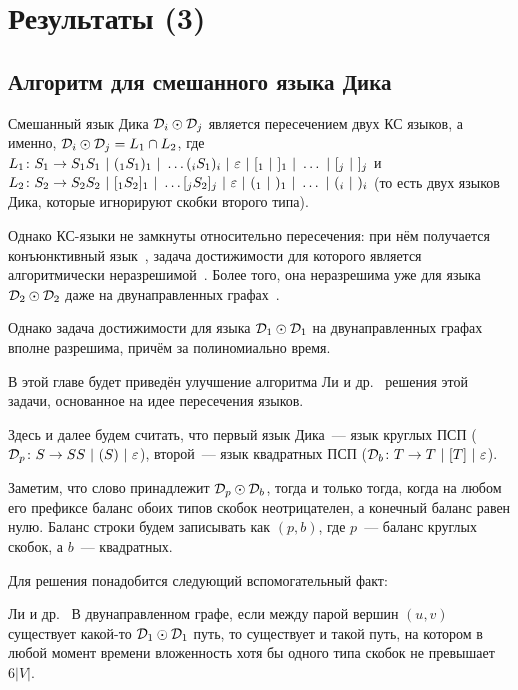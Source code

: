 \section{Результаты (3)}\label{section:dyck_1_1}

\subsection{Алгоритм для смешанного языка Дика}

Смешанный язык Дика $\mathcal{D}_i \odot \mathcal{D}_j$ является пересечением двух КС языков, а именно, 
$\mathcal{D}_i \odot \mathcal{D}_j = L_1 \cap L_2$, где 
$L_1 \colon S_1 \rightarrow S_1 S_1~|~(_1 S_1 )_1~|~ \dots (_i S_1 )_i ~|~ \varepsilon ~|~ [_1 ~|~ ]_1 ~|~ \dots ~|~ [_j ~|~ ]_j$ и 
$L_2 \colon S_2 \rightarrow S_2 S_2~|~[_1 S_2 ]_1~|~ \dots [_j S_2 ]_j ~|~ \varepsilon ~|~ (_1 ~|~ )_1 ~|~ \dots ~|~ (_i ~|~ )_i$ 
(то есть двух языков Дика, которые игнорируют скобки второго типа). 

Однако КС-языки не замкнуты относительно пересечения: при нём получается конъюнктивный язык~\cite{Okhotin01}, задача достижимости для которого является алгоритмически неразрешимой~\cite{Hellings14}. Более того, она неразрешима уже для языка $\mathcal{D}_2 \odot \mathcal{D}_2$ даже на двунаправленных графах~\cite{Li21}. 

Однако задача достижимости для языка $\mathcal{D}_1 \odot \mathcal{D}_1$ на двунаправленных графах вполне разрешима, причём за полиномиально время.

В этой главе будет приведён улучшение алгоритма Ли и др.~\cite{Li21} решения этой задачи, основанное на идее пересечения языков.

\begin{note}\label{fact:intersection}

  Здесь и далее будем считать, что первый язык Дика~--- язык круглых ПСП ($\mathcal{D}_p \colon S \rightarrow SS~|~(S)~|~\varepsilon$), второй~--- язык квадратных ПСП ($\mathcal{D}_b \colon T \rightarrow T~|~[T]~|~\varepsilon$).
\end{note}

Заметим, что слово принадлежит $\mathcal{D}_p \odot \mathcal{D}_b$, тогда и только тогда, когда на любом его префиксе баланс обоих типов скобок неотрицателен, а конечный баланс равен нулю. Баланс строки будем записывать как $(p, b)$, где $p$~--- баланс круглых скобок, а $b$~--- квадратных.

Для решения понадобится следующий вспомогательный факт:

\begin{lemma}{Ли и др.~\cite{Li21}}\label{lm:dyck_6v}
  В двунаправленном графе, если между парой вершин $(u, v)$ существует какой-то $\mathcal{D}_1 \odot \mathcal{D}_1$ путь, то существует и такой путь, на котором в любой момент времени вложенность хотя бы одного типа скобок не превышает $6 |V|$.
\end{lemma}

